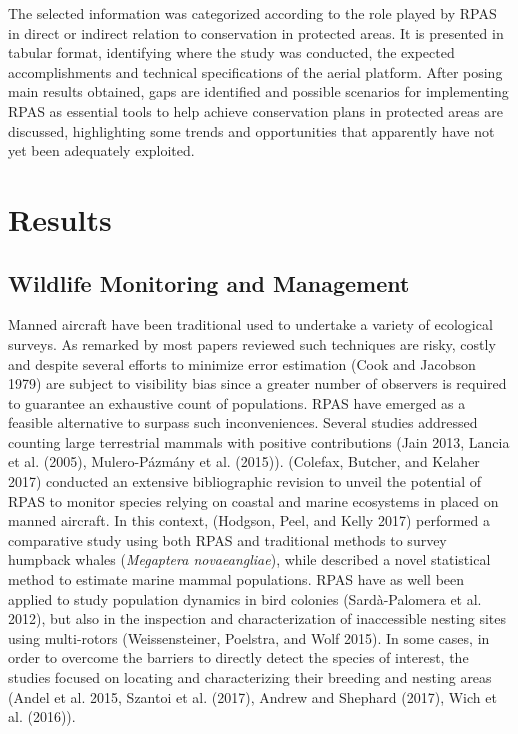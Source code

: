 \documentclass[]{interact}
\theoremstyle{plain}%
\theoremstyle{definition}
\theoremstyle{remark}
\begin{document}
The selected information was categorized according to the role played by
RPAS in direct or indirect relation to conservation in protected areas.
It is presented in tabular format, identifying where the study was
conducted, the expected accomplishments and technical specifications of
the aerial platform. After posing main results obtained, gaps are
identified and possible scenarios for implementing RPAS as essential
tools to help achieve conservation plans in protected areas are
discussed, highlighting some trends and opportunities that apparently
have not yet been adequately exploited.

\section{Results}\label{results}

\subsection{Wildlife Monitoring and
Management}\label{wildlife-monitoring-and-management}

Manned aircraft have been traditional used to undertake a variety of
ecological surveys. As remarked by most papers reviewed such techniques
are risky, costly and despite several efforts to minimize error
estimation (Cook and Jacobson 1979) are subject to visibility bias since
a greater number of observers is required to guarantee an exhaustive
count of populations. RPAS have emerged as a feasible alternative to
surpass such inconveniences. Several studies addressed counting large
terrestrial mammals with positive contributions (Jain 2013, Lancia et
al. (2005), Mulero-Pázmány et al. (2015)). (Colefax, Butcher, and
Kelaher 2017) conducted an extensive bibliographic revision to unveil
the potential of RPAS to monitor species relying on coastal and marine
ecosystems in placed on manned aircraft. In this context, (Hodgson,
Peel, and Kelly 2017) performed a comparative study using both RPAS and
traditional methods to survey humpback whales (\emph{Megaptera
novaeangliae}), while described a novel statistical method to estimate
marine mammal populations. RPAS have as well been applied to study
population dynamics in bird colonies (Sardà-Palomera et al. 2012), but
also in the inspection and characterization of inaccessible nesting
sites using multi-rotors (Weissensteiner, Poelstra, and Wolf 2015). In
some cases, in order to overcome the barriers to directly detect the
species of interest, the studies focused on locating and characterizing
their breeding and nesting areas (Andel et al. 2015, Szantoi et al.
(2017), Andrew and Shephard (2017), Wich et al. (2016)).
\end{document}
